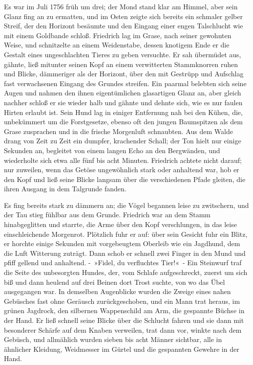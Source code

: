 Es war im Juli 1756 früh um drei; der Mond stand klar am Himmel, aber sein Glanz fing an zu ermatten, und im Osten zeigte sich bereits ein schmaler gelber Streif, der den Horizont besäumte und den Eingang einer engen Talschlucht wie mit einem Goldbande schloß. Friedrich lag im Grase, nach seiner gewohnten Weise, und schnitzelte an einem Weidenstabe, dessen knotigem Ende er die Gestalt eines ungeschlachten Tieres zu geben versuchte. Er sah übermüdet aus, gähnte, ließ mitunter seinen Kopf an einem verwitterten Stammknorren ruhen und Blicke, dämmeriger als der Horizont, über den mit Gestrüpp und Aufschlag fast verwachsenen Eingang des Grundes streifen. Ein paarmal belebten sich seine Augen und nahmen den ihnen eigentümlichen glasartigen Glanz an, aber gleich nachher schloß er sie wieder halb und gähnte und dehnte sich, wie es nur faulen Hirten erlaubt ist. Sein Hund lag in einiger Entfernung nah bei den Kühen, die, unbekümmert um die Forstgesetze, ebenso oft den jungen Baumspitzen als dem Grase zusprachen und in die frische Morgenluft schnaubten. Aus dem Walde drang von Zeit zu Zeit ein dumpfer, krachender Schall; der Ton hielt nur einige Sekunden an, begleitet von einem langen Echo an den Bergwänden, und wiederholte sich etwa alle fünf bis acht Minuten. Friedrich achtete nicht darauf; nur zuweilen, wenn das Getöse ungewöhnlich stark oder anhaltend war, hob er den Kopf und ließ seine Blicke langsam über die verschiedenen Pfade gleiten, die ihren Ausgang in dem Talgrunde fanden.

Es fing bereits stark zu dämmern an; die Vögel begannen leise zu zwitschern, und der Tau stieg fühlbar aus dem Grunde. Friedrich war an dem Stamm hinabgeglitten und starrte, die Arme über den Kopf verschlungen, in das leise einschleichende Morgenrot. Plötzlich fuhr er auf: über sein Gesicht fuhr ein Blitz, er horchte einige Sekunden mit vorgebeugtem Oberleib wie ein Jagdhund, dem die Luft Witterung zuträgt. Dann schob er schnell zwei Finger in den Mund und pfiff gellend und anhaltend. - »Fidel, du verfluchtes Tier!« - Ein Steinwurf traf die Seite des unbesorgten Hundes, der, vom Schlafe aufgeschreckt, zuerst um sich biß und dann heulend auf drei Beinen dort Trost suchte, von wo das Übel ausgegangen war. In demselben Augenblicke wurden die Zweige eines nahen Gebüsches fast ohne Geräusch zurückgeschoben, und ein Mann trat heraus, im grünen Jagdrock, den silbernen Wappenschild am Arm, die gespannte Büchse in der Hand. Er ließ schnell seine Blicke über die Schlucht fahren und sie dann mit besonderer Schärfe auf dem Knaben verweilen, trat dann vor, winkte nach dem Gebüsch, und allmählich wurden sieben bis acht Männer sichtbar, alle in ähnlicher Kleidung, Weidmesser im Gürtel und die gespannten Gewehre in der Hand.

